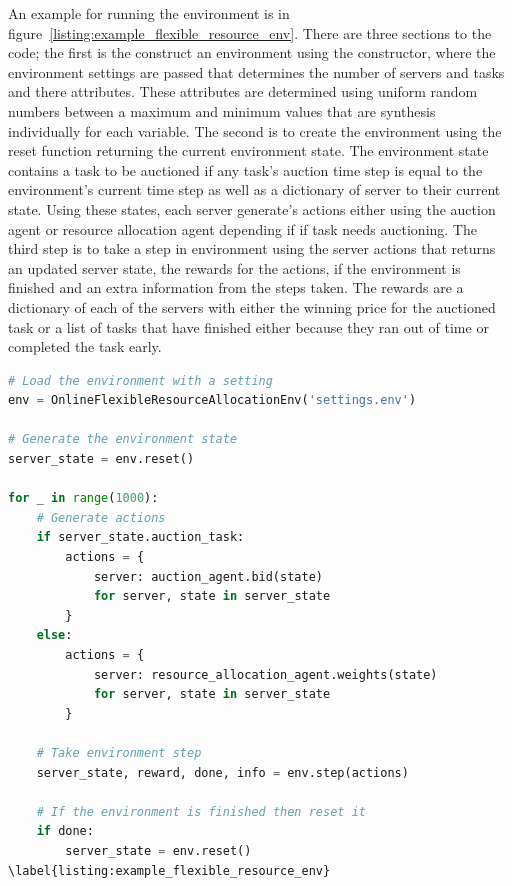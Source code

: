 An example for running the environment is in figure~\ref{listing:example_flexible_resource_env}. There are three
sections to the code; the first is the construct an environment using the constructor, where the environment settings
are passed that determines the number of servers and tasks and there attributes. These attributes are determined using
uniform random numbers between a maximum and minimum values that are synthesis individually for each variable. The
second is to create the environment using the reset function returning the current environment state. The environment
state contains a task to be auctioned if any task's auction time step is equal to the environment's current time step
as well as a dictionary of server to their current state. Using these states, each server generate's actions either
using the auction agent or resource allocation agent depending if if task needs auctioning. The third step is to
take a step in environment using the server actions that returns an updated server state, the rewards for the actions,
if the environment is finished and an extra information from the steps taken. The rewards are a dictionary of each of
the servers with either the winning price for the auctioned task or a list of tasks that have finished either because
they ran out of time or completed the task early.

\begin{lstlisting}[language=Python, frame=single, caption={An example for running the environment},captionpos=b]
# Load the environment with a setting
env = OnlineFlexibleResourceAllocationEnv('settings.env')

# Generate the environment state
server_state = env.reset()

for _ in range(1000):
    # Generate actions
    if server_state.auction_task:
        actions = {
            server: auction_agent.bid(state)
            for server, state in server_state
        }
    else:
        actions = {
            server: resource_allocation_agent.weights(state)
            for server, state in server_state
        }

    # Take environment step
    server_state, reward, done, info = env.step(actions)

    # If the environment is finished then reset it
    if done:
        server_state = env.reset()
\label{listing:example_flexible_resource_env}
\end{lstlisting}

